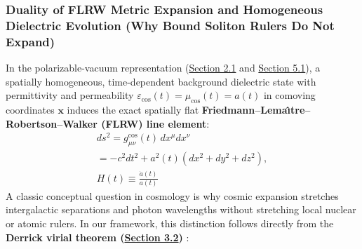 \documentclass[10pt,aps,prd,twocolumn,superscriptaddress,nofootinbib,floatfix,longbibliography,showkeys]{revtex4-2}
\begin{document}
\subsubsection{Duality of FLRW Metric Expansion and Homogeneous Dielectric Evolution (Why Bound Soliton Rulers Do Not Expand)}

In the polarizable-vacuum representation (\hyperref[sec:2.1]{Section 2.1} and \hyperref[sec:5.1]{Section 5.1}), a spatially homogeneous, time-dependent background dielectric state with permittivity and permeability $\varepsilon_{\text{cos}}(t) = \mu_{\text{cos}}(t) = a(t)$ in comoving coordinates $\mathbf{x}$ induces the exact spatially flat \textbf{Friedmann--Lema\^{\i}tre--Robertson--Walker (FLRW) line element}:
\begin{equation}\begin{gathered}
ds^2 = g_{\mu\nu}^{\text{cos}}(t)\,dx^\mu dx^\nu \\
= -c^2 dt^2 + a^2(t)\left(dx^2 + dy^2 + dz^2\right), \\
H(t) \equiv \frac{\dot{a}(t)}{a(t)}
\end{gathered}\end{equation}
A classic conceptual question in cosmology is why cosmic expansion stretches intergalactic separations and photon wavelengths without stretching local nuclear or atomic rulers. In our framework, this distinction follows directly from the \textbf{Derrick virial theorem (\hyperref[sec:3.2]{Section 3.2})} \cite{ref18}:
\end{document}
